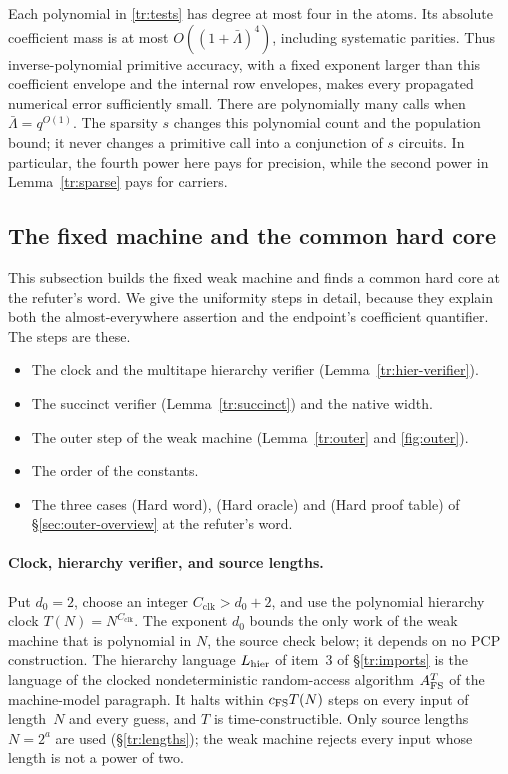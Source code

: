 \documentclass[11pt,letterpaper]{article}
\theoremstyle{definition}
\theoremstyle{remark}
\begin{document}
Each polynomial in \eqref{tr:tests} has degree at most four in the
atoms. Its absolute coefficient mass is at most
$O((1+\bar\Lambda)^4)$, including systematic parities.
Thus inverse-polynomial primitive accuracy, with a fixed exponent
larger than this coefficient envelope and the internal row envelopes,
makes every propagated numerical error sufficiently small.
There are polynomially many calls when $\bar\Lambda=q^{O(1)}$.
The sparsity $s$ changes this polynomial count and the population
bound; it never changes a primitive call into a conjunction of $s$
circuits. In particular, the fourth power here pays for precision,
while the second power in Lemma~\ref{tr:sparse} pays for carriers.

\subsection{The fixed machine and the common hard core}
\label{tr:machine}

This subsection builds the fixed weak machine and finds a common hard
core at the refuter's word. We give the uniformity steps in detail,
because they explain both the almost-everywhere assertion and the
endpoint's coefficient quantifier. The steps are these.
\begin{itemize}
\item The clock and the multitape hierarchy verifier
(Lemma~\ref{tr:hier-verifier}).
\item The succinct verifier (Lemma~\ref{tr:succinct}) and the native
width.
\item The outer step of the weak machine (Lemma~\ref{tr:outer} and
\cref{fig:outer}).
\item The order of the constants.
\item The three cases (Hard word), (Hard oracle) and (Hard proof table)
of \S\ref{sec:outer-overview} at the refuter's word.
\end{itemize}

\paragraph{Clock, hierarchy verifier, and source lengths.}
Put $d_0=2$, choose an integer $C_{\mathrm{clk}}>d_0+2$, and use the
polynomial hierarchy clock $T(N)=N^{C_{\mathrm{clk}}}$. The exponent
$d_0$ bounds the only work of the weak machine that is polynomial in
$N$, the source check below; it depends on no PCP construction. The
hierarchy language $L_{\rm hier}$ of item~3 of \S\ref{tr:imports} is
the language of the clocked nondeterministic random-access algorithm
$A^T_{\rm FS}$ of the machine-model paragraph. It halts within
$c_{\rm FS}T(N)$ steps on every input of length~$N$ and every guess, and
$T$ is time-constructible. Only source lengths $N=2^a$ are used
(\S\ref{tr:lengths}); the weak machine rejects every input whose length
is not a power of two.
\end{document}
